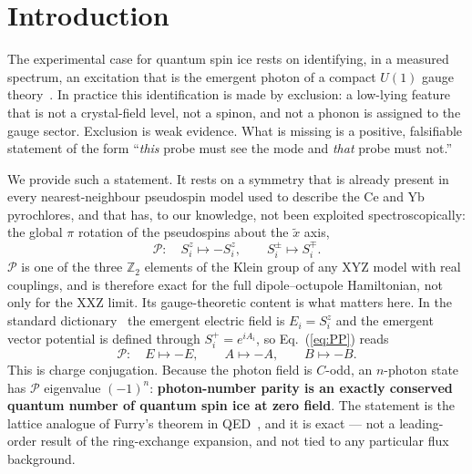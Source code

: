 \documentclass[aps,prl,preprint,amsmath,amssymb,superscriptaddress,
longbibliography,floatfix]{revtex4-2}
\newcommand{\PP}{\mathcal{P}}
\begin{document}
\maketitle

\section{Introduction}

The experimental case for quantum spin ice rests on identifying, in a measured
spectrum, an excitation that is the emergent photon of a compact $U(1)$ gauge
theory~\cite{Hermele2004,Gingras2014,Benton2012,RauGingras2019}.  In practice
this identification is made by exclusion: a low-lying feature that is not a
crystal-field level, not a spinon, and not a phonon is assigned to the gauge
sector.  Exclusion is weak evidence.  What is missing is a positive,
falsifiable statement of the form ``\emph{this} probe must see the mode and
\emph{that} probe must not.''

We provide such a statement.  It rests on a symmetry that is already present in
every nearest-neighbour pseudospin model used to describe the Ce and Yb
pyrochlores, and that has, to our knowledge, not been exploited
spectroscopically: the global $\pi$ rotation of the pseudospins about the
$\tilde x$ axis,
\begin{equation}
 \PP:\quad S^z_i\mapsto -S^z_i,\qquad S^{\pm}_i\mapsto S^{\mp}_i .
 \label{eq:PP}
\end{equation}
$\PP$ is one of the three $\mathbb{Z}_2$ elements of the Klein group of any
XYZ model with real couplings, and is therefore exact for the full
dipole--octupole Hamiltonian, not only for the XXZ limit.  Its gauge-theoretic
content is what matters here.  In the standard
dictionary~\cite{Hermele2004} the emergent electric field is $E_i = S^z_i$ and
the emergent vector potential is defined through $S^+_i = e^{iA_i}$, so
Eq.~(\ref{eq:PP}) reads
\begin{equation}
 \PP:\quad E\mapsto -E,\qquad A\mapsto -A,\qquad B\mapsto -B .
 \label{eq:C}
\end{equation}
This is charge conjugation.  Because the photon field is $C$-odd, an
$n$-photon state has $\PP$ eigenvalue $(-1)^n$: \textbf{photon-number parity is
an exactly conserved quantum number of quantum spin ice at zero field}.  The
statement is the lattice analogue of Furry's theorem in
QED~\cite{Furry1937}, and it is exact --- not a leading-order result of the
ring-exchange expansion, and not tied to any particular flux background.
\end{document}
